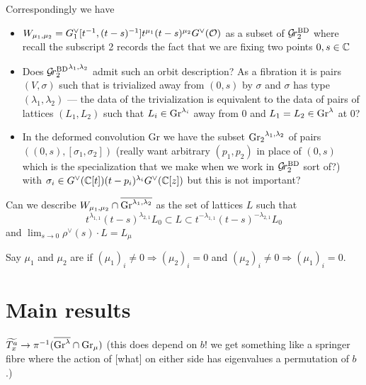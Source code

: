 \documentclass{article}
\begin{document}
Correspondingly we have 
\begin{itemize}
    \item $W_{\mu_1,\mu_2} = \Gch_1 [t^{-1},(t-s)^{-1}]t^{\mu_1} (t-s)^{\mu_2} \Gch(\cO)$ as a subset of $\Grbd[2]$ where recall the subscript 2 records the fact that we are fixing two points $0,s\in\CC$
    \item Does $\Grbd[2]^{\lambda_1,\lambda_2}$ admit such an orbit description? As a fibration it is pairs $(V,\sigma)$ such that is trivialized away from $(0,s)$ by $\sigma$ and $\sigma$ has type $(\lambda_1,\lambda_2)$ --- the data of the trivialization is equivalent to the data of pairs of lattices $(L_1,L_2)$ such that $L_i \in \Gr^{\lambda_i}$ away from $0$ and $L_1 = L_2\in\Gr^{\lambda}$ at 0?  
    \item In the deformed convolution Gr we have the subset $\Grc[2]^{\lambda_1,\lambda_2}$ of pairs $((0,s),[\sigma_1,\sigma_2])$ (really want arbitrary $(p_1,p_2)$ in place of $(0,s)$ which is the specialization that we make when we work in $\Grbd[2]$ sort of?) with $\sigma_i\in\Gch(\CC[t])(t-p_i)^{\lambda_i}\Gch(\CC[z])$ but this is not important? 
\end{itemize}

\begin{question}
    Can we describe $W_{\mu_1,\mu_2}\cap \overline{\Gr^{\lambda_1,\lambda_2}}$ as the set of lattices $L$ such that 
    \[
        t^{\lambda_{1,1}}(t-s)^{\lambda_{2,1}}L_0 \subset L \subset t^{-\lambda_{1,1}}(t-s)^{-\lambda_{2,1}}L_0
    \]
    and $\lim_{s\to 0} \rho^\vee (s)\cdot L = L_\mu$
\end{question}


\begin{definition}
    Say $\mu_1$ and $\mu_2$ are  if $(\mu_1)_i\ne 0 \Rightarrow (\mu_2)_i = 0$ and $(\mu_2)_i\ne 0 \Rightarrow (\mu_1)_i = 0$. 
\end{definition}


\section{Main results}

\begin{claim}
$\widetilde{T_x^a}\to\pi^{-1}(\overline{\Gr^\lambda}\cap\Gr_\mu)$ (this does depend on $b$! we get something like a springer fibre where the action of [what] on either side has eigenvalues a permutation of $b$.)
\end{claim}
\end{document}
